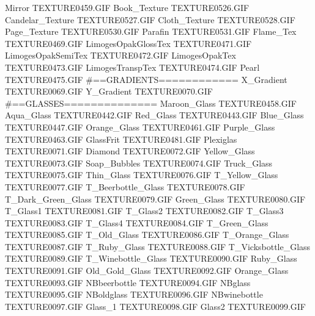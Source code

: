 Mirror                         TEXTURE\TEX0459.GIF
Book_Texture                   TEXTURE\TEX0526.GIF
Candelar_Texture               TEXTURE\TEX0527.GIF
Cloth_Texture                  TEXTURE\TEX0528.GIF
Page_Texture                   TEXTURE\TEX0530.GIF
Parafin                        TEXTURE\TEX0531.GIF
Flame_Tex                      TEXTURE\TEX0469.GIF
LimogesOpakGlossTex            TEXTURE\TEX0471.GIF
LimogesOpakSemiTex             TEXTURE\TEX0472.GIF
LimogesOpakTex                 TEXTURE\TEX0473.GIF
LimogesTranspTex               TEXTURE\TEX0474.GIF
Pearl                          TEXTURE\TEX0475.GIF
#==GRADIENTS============
X_Gradient                     TEXTURE\TEX0069.GIF
Y_Gradient                     TEXTURE\TEX0070.GIF
#==GLASSES==============
Maroon_Glass                   TEXTURE\TEX0458.GIF
Aqua_Glass                     TEXTURE\TEX0442.GIF
Red_Glass                      TEXTURE\TEX0443.GIF
Blue_Glass                     TEXTURE\TEX0447.GIF
Orange_Glass                   TEXTURE\TEX0461.GIF
Purple_Glass                   TEXTURE\TEX0463.GIF
GlassFrit                      TEXTURE\TEX0481.GIF
Plexiglas                      TEXTURE\TEX0071.GIF
Diamond                        TEXTURE\TEX0072.GIF
Yellow_Glass                   TEXTURE\TEX0073.GIF
Soap_Bubbles                   TEXTURE\TEX0074.GIF
Truck_Glass                    TEXTURE\TEX0075.GIF
Thin_Glass                     TEXTURE\TEX0076.GIF
T_Yellow_Glass                 TEXTURE\TEX0077.GIF
T_Beerbottle_Glass             TEXTURE\TEX0078.GIF
T_Dark_Green_Glass             TEXTURE\TEX0079.GIF
Green_Glass                    TEXTURE\TEX0080.GIF
T_Glass1                       TEXTURE\TEX0081.GIF
T_Glass2                       TEXTURE\TEX0082.GIF
T_Glass3                       TEXTURE\TEX0083.GIF
T_Glass4                       TEXTURE\TEX0084.GIF
T_Green_Glass                  TEXTURE\TEX0085.GIF
T_Old_Glass                    TEXTURE\TEX0086.GIF
T_Orange_Glass                 TEXTURE\TEX0087.GIF
T_Ruby_Glass                   TEXTURE\TEX0088.GIF
T_Vicksbottle_Glass            TEXTURE\TEX0089.GIF
T_Winebottle_Glass             TEXTURE\TEX0090.GIF
Ruby_Glass                     TEXTURE\TEX0091.GIF
Old_Gold_Glass                 TEXTURE\TEX0092.GIF
Orange_Glass                   TEXTURE\TEX0093.GIF
NBbeerbottle                   TEXTURE\TEX0094.GIF
NBglass                        TEXTURE\TEX0095.GIF
NBoldglass                     TEXTURE\TEX0096.GIF
NBwinebottle                   TEXTURE\TEX0097.GIF
Glass_1                        TEXTURE\TEX0098.GIF
Glass2                         TEXTURE\TEX0099.GIF
